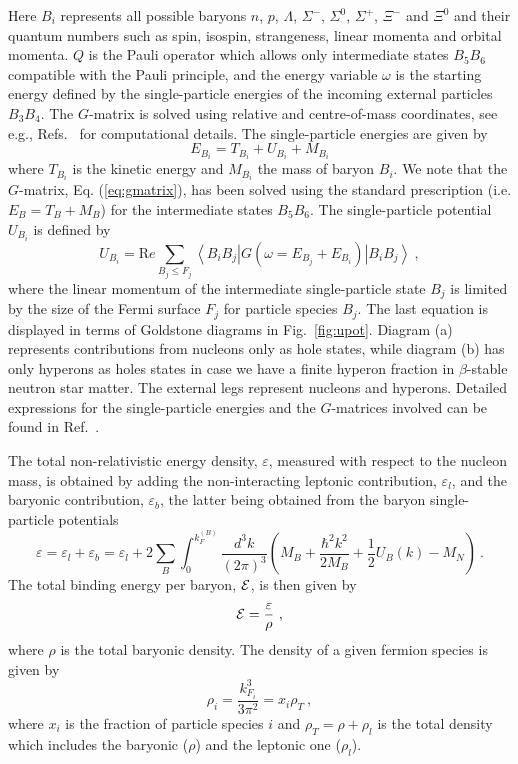 Here $B_i$ represents all possible baryons $n$, $p$, $\Lambda$, $\Sigma^{-}$,
$\Sigma^0$, $\Sigma^+$, $\Xi^-$ and $\Xi^0$ and their quantum numbers
such as spin, isospin, strangeness, linear momenta and orbital momenta.
$Q$ is the Pauli operator which allows only intermediate states $B_5B_6$ 
compatible with the Pauli principle, and the energy variable $\omega$ is 
the starting 
energy
defined by the single-particle energies
of the incoming external particles $B_3B_4$.
The $G$-matrix is solved using relative and centre-of-mass coordinates,
see e.g., Refs.~\cite{isaac99,sl99} for computational details.
The single-particle energies are given by
\begin{equation}
      E_{B_i}=T_{B_i} + U_{B_i} +M_{B_i}
       \label{eq:spenergy}
\end{equation}
where $T_{B_i}$ is the kinetic energy and $M_{B_i}$
the mass of baryon ${B_i}$. 
We note that the $G$-matrix, Eq. (\ref{eq:gmatrix}), has been solved
using 
the standard prescription (i.e. $E_{B}=T_B+M_B$)
for the
intermediate states $B_5B_6$.
The single-particle potential $U_{B_i}$ is defined by 
\begin{equation}
       U_{B_i}={\mathrm Re} \sum_{B_j\leq F_j}
       \left\langle B_iB_j\right |
       G(\omega=E_{B_j}+E_{B_i})
       \left | B_iB_j \right\rangle \ ,
\end{equation}
where the linear momentum of the intermediate
single-particle state $B_j$ is limited by the size of the Fermi surface
$F_j$ for particle species $B_j$.
The last equation is displayed in terms of Goldstone diagrams
in Fig.\ \ref{fig:upot}. Diagram (a) represents contributions
from nucleons only as hole states, while diagram (b)
has only hyperons as holes states in case we have a finite hyperon
fraction in $\beta$-stable neutron star matter. The external legs
represent nucleons and hyperons. 
Detailed expressions for the single-particle energies and the $G$-matrices
involved can be found in Ref.\ \cite{isaac99}. 

The total non-relativistic energy density, $\varepsilon$, measured with
respect to the nucleon mass, is
obtained by adding the non-interacting 
leptonic contribution, $\varepsilon_l$, and  the
baryonic contribution, $\varepsilon_b$, the latter being obtained
from the baryon
single-particle potentials
\begin{equation}
\varepsilon=\varepsilon_l+\varepsilon_b=\varepsilon_l+2\sum_{B}
\int_0^{k_F^{(B)}} \frac{d^3 k}{(2\pi)^3}
\left(M_B + \frac{\hbar^2k^2}{2M_B}+\frac{1}{2}U_B(k) - M_N \right) \ .
\label{eq:binding}
\end{equation}
The total binding
energy per baryon, ${\cal E}$, is then given by
\begin{equation}
{\cal E}=\frac{\varepsilon}{\rho} \ ,
\label{eq:binding2}
\end{equation}
where $\rho$ is the total baryonic density. The density of a given fermion 
species is given by
\begin{equation}
\rho_{i}=\frac{k_{F_i}^3}{3\pi^2}=x_{i}\rho_T \ ,
\end{equation}
where
$x_i$ is the fraction of particle species $i$ and
$\rho_T=\rho+\rho_l$ is the total density which includes the
baryonic ($\rho$) and 
the leptonic one ($\rho_l$).


